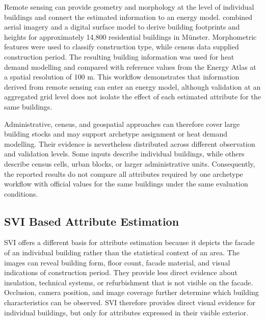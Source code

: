 Remote sensing can provide geometry and morphology at the level of individual buildings and connect the estimated information to an energy model. \textcite{wurm2021} combined aerial imagery and a digital surface model to derive building footprints and heights for approximately 14,800 residential buildings in M\"unster. Morphometric features were used to classify construction type, while census data supplied construction period. The resulting building information was used for heat demand modelling and compared with reference values from the Energy Atlas at a spatial resolution of 100 m. This workflow demonstrates that information derived from remote sensing can enter an energy model, although validation at an aggregated grid level does not isolate the effect of each estimated attribute for the same buildings.

Administrative, census, and geospatial approaches can therefore cover large building stocks and may support archetype assignment or heat demand modelling. Their evidence is nevertheless distributed across different observation and validation levels. Some inputs describe individual buildings, while others describe census cells, urban blocks, or larger administrative units. Consequently, the reported results do not compare all attributes required by one archetype workflow with official values for the same buildings under the same evaluation conditions.

\subsection{SVI Based Attribute Estimation}
\label{sec:street_view_attribute_estimation}

\Ac{SVI} offers a different basis for attribute estimation because it depicts the facade of an individual building rather than the statistical context of an area. The images can reveal building form, floor count, facade material, and visual indications of construction period. They provide less direct evidence about insulation, technical systems, or refurbishment that is not visible on the facade. Occlusion, camera position, and image coverage further determine which building characteristics can be observed. \Ac{SVI} therefore provides direct visual evidence for individual buildings, but only for attributes expressed in their visible exterior.

